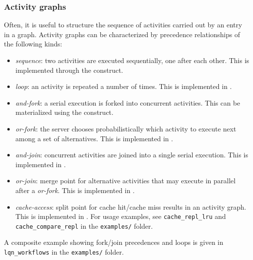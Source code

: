 
\subsubsection{Activity graphs}
Often, it is useful to structure the sequence of activities carried out by an entry in a graph. Activity graphs can be characterized by precedence relationships of the following kinds: 
\begin{itemize}
    \item \textit{sequence}: two activities are executed sequentially, one after each other. This is implemented through the  construct.
    \item \textit{loop}: an activity is repeated a number of times. This is implemented in .
    \item \textit{and-fork}: a serial execution is forked into concurrent activities. This can be materialized using the  construct.
    \item \textit{or-fork}: the server chooses probabilistically which activity to execute next among a set of alternatives. This is implemented in .
    \item \textit{and-join}: concurrent activities are joined into a single serial execution. This is implemented in .
    \item \textit{or-join}: merge point for alternative activities that may execute in parallel after a \textit{or-fork}. This is implemented in .
    \item \textit{cache-access}: split point for cache hit/cache miss results in an activity graph. This is implemented in . For usage examples, see \texttt{cache\_repl\_lru} and \texttt{cache\_compare\_repl} in the \texttt{examples/} folder.
\end{itemize}
A composite example showing fork/join precedences and loops is given in \texttt{lqn\_workflows} in the \texttt{examples/} folder.

